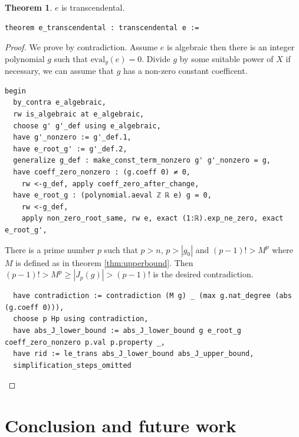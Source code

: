 \documentclass{report}
\theoremstyle{definition}
\newtheorem{theorem}{Theorem}[section]
\begin{document}
\begin{theorem}
$e$ is transcendental.

\begin{verbatim}
theorem e_transcendental : transcendental e :=
\end{verbatim}
\end{theorem}
\begin{proof}
We prove by contradiction. Assume $e$ is algebraic then there is an integer polynomial $g$ such that $\mathrm{eval}_g(e)=0$. Divide $g$ by some suitable power of $X$ if necessary, we can assume that $g$ has a non-zero constant coefficent.

\begin{verbatim}
begin
  by_contra e_algebraic,
  rw is_algebraic at e_algebraic,
  choose g' g'_def using e_algebraic,
  have g'_nonzero := g'_def.1,
  have e_root_g' := g'_def.2,
  generalize g_def : make_const_term_nonzero g' g'_nonzero = g,
  have coeff_zero_nonzero : (g.coeff 0) ≠ 0,
    rw <-g_def, apply coeff_zero_after_change,
  have e_root_g : (polynomial.aeval ℤ ℝ e) g = 0,
    rw <-g_def,
    apply non_zero_root_same, rw e, exact (1:ℝ).exp_ne_zero, exact e_root_g',
\end{verbatim}

There is a prime number $p$ such that $p>n$, $p>|g_0|$ and $(p-1)!>M^p$ where $M$ is defined as in theorem \ref{thm:upperbound}. Then $(p-1)!>M^p\ge|J_p(g)|>(p-1)!$ is the desired contradiction.
\begin{verbatim}
  have contradiction := contradiction (M g) _ (max g.nat_degree (abs (g.coeff 0))),
  choose p Hp using contradiction,
  have abs_J_lower_bound := abs_J_lower_bound g e_root_g coeff_zero_nonzero p.val p.property _,
  have rid := le_trans abs_J_lower_bound abs_J_upper_bound,
  simplification_steps_omitted
\end{verbatim}
\end{proof}

\chapter*{Conclusion and future work}
\end{document}
